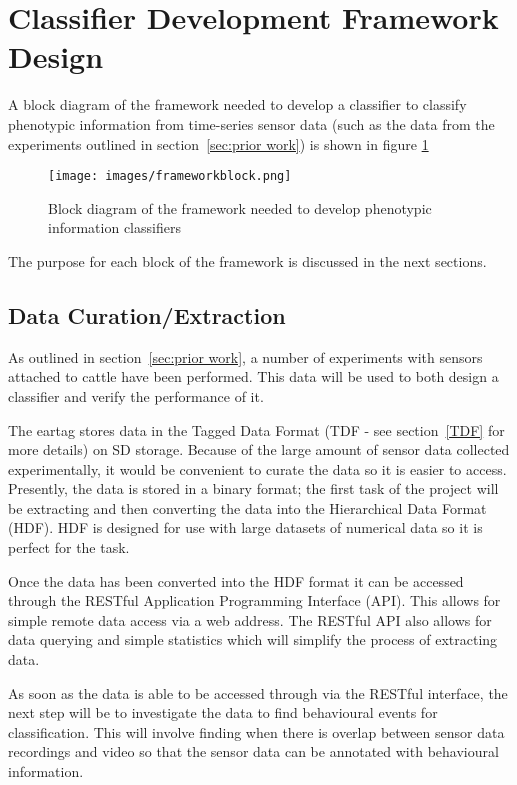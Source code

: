 \section{Classifier Development Framework Design}

A block diagram of the framework needed to develop a classifier to classify phenotypic information from time-series sensor data (such as the data from the experiments outlined in section~\ref{sec:prior work}) is shown in figure \ref{frameworkblock}

\begin{figure}[ht!]
\begin{center}
\leavevmode
\texttt{[image: images/frameworkblock.png]}
\end{center}
\caption[Framework block diagram]{Block diagram of the framework needed to develop phenotypic information classifiers}
\label{frameworkblock}
\end{figure}

The purpose for each block of the framework is discussed in the next sections.

\subsection{Data Curation/Extraction}
As outlined in  section~\ref{sec:prior work}, a number of experiments with sensors attached to cattle have been performed. This data will be used to both design a classifier and verify the performance of it. 

The eartag stores data in the Tagged Data Format (TDF - see section~\ref{TDF} for more details) on SD storage. Because of the large amount of sensor data collected experimentally, it would be convenient to curate the data so it is easier to access. Presently, the data is stored in a binary format; the first task of the project will be extracting and then converting the data into the Hierarchical Data Format (HDF). HDF is designed for use with large datasets of numerical data so it is perfect for the task.

Once the data has been converted into the HDF format it can be accessed through the RESTful Application Programming Interface (API). This allows for simple remote data access via a web address. The RESTful API also allows for data querying and simple statistics which will simplify the process of extracting data.

As soon as the data is able to be accessed through via the RESTful interface, the next step will be to investigate the data to find behavioural events for classification. This will involve finding when there is overlap between sensor data recordings and video so that the sensor data can be annotated with behavioural information.

